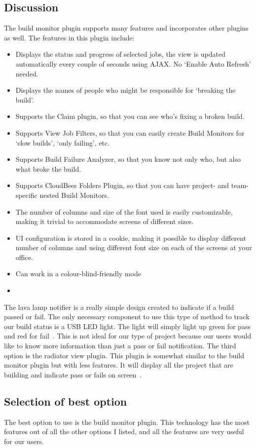 \documentclass[10pt,letterpaper,onecolumn,journal]{IEEEtran}
\begin{document}
\subsection{Discussion}
The build monitor plugin supports many features and incorporates other plugins as well.
The features in this plugin include:
\begin{itemize}
  \item Displays the status and progress of selected jobs, the view is updated automatically every couple of seconds using AJAX\@. No `Enable Auto Refresh' needed.
  \item Displays the names of people who might be responsible for `breaking the build'.
  \item Supports the Claim plugin, so that you can see who's fixing a broken build.
  \item Supports View Job Filters, so that you can easily create Build Monitors for `slow builds', `only failing', etc.
  \item Supports Build Failure Analyzer, so that you know not only who, but also what broke the build.
  \item Supports CloudBees Folders Plugin, so that you can have project- and team-specific nested Build Monitors.
  \item The number of columns and size of the font used is easily customizable, making it trivial to accommodate screens of different sizes.
  \item UI configuration is stored in a cookie, making it possible to display different number of columns and using different font size on each of the screens at your office.
  \item Can work in a colour-blind-friendly mode
  \item~\cite{buildmonitor}
\end{itemize}
The lava lamp notifier is a really simple design created to indicate if a build passed or fail.
The only necessary component to use this type of method to track our build status is a USB LED light.
The light will simply light up green for pass and red for fail~\cite{lavalamp}.
This is not ideal for our type of project because our users would like to know more information than just a pass or fail notification.
The third option is the radiator view plugin.
This plugin is somewhat similar to the build monitor plugin but with less features.
It will display all the project that are building and indicate pass or fails on screen~\cite{radiatorview}.
\subsection{Selection of best option}
The best option to use is the build monitor plugin.
This technology has the most features out of all the other options I listed, and all the features are very useful for our users.
\end{document}
